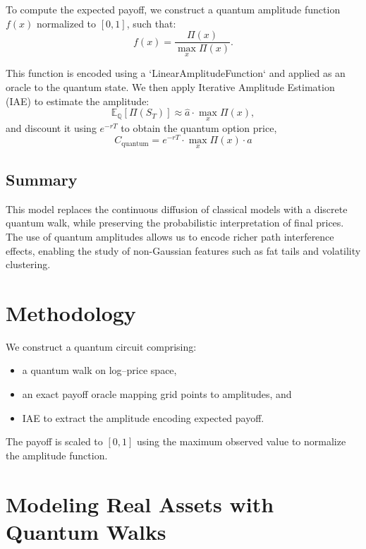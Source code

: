 \documentclass[11pt]{article}
\begin{document}
To compute the expected payoff, we construct a quantum amplitude function $f(x)$ normalized to $[0,1]$, such that:
\begin{equation}
f(x) = \frac{\Pi(x)}{\max_x \Pi(x)}.
\end{equation}

This function is encoded using a `LinearAmplitudeFunction` and applied as an oracle to the quantum state. We then apply Iterative Amplitude Estimation (IAE) to estimate the amplitude:
\begin{equation}
\mathbb{E}_\mathbb{Q}[\Pi(S_T)] \approx \hat{a} \cdot \max_x \Pi(x),
\end{equation}
and discount it using $e^{-rT}$ to obtain the quantum option price,
\begin{equation}
C_{\text{quantum}} = e^{-rT} \cdot \max_x \Pi(x) \cdot \hat{a}
\end{equation}


\subsection{Summary}

This model replaces the continuous diffusion of classical models with a discrete quantum walk, while preserving the probabilistic interpretation of final prices. The use of quantum amplitudes allows us to encode richer path interference effects, enabling the study of non-Gaussian features such as fat tails and volatility clustering.



\section{Methodology}
We construct a quantum circuit comprising:
\begin{itemize}
\item a quantum walk on log--price space,
\item an exact payoff oracle mapping grid points to amplitudes, and
\item IAE to extract the amplitude encoding expected payoff.
\end{itemize}

The payoff is scaled to $[0,1]$ using the maximum observed value to normalize the
amplitude function.

\section{Modeling Real Assets with Quantum Walks}
\label{sec:modeling_assets}
\end{document}
